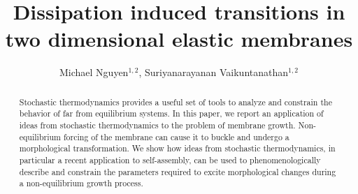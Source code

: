 \documentclass[amsmath,preprintnumbers,10pt,nofootinbib,prl,twocolumn]{revtex4-1}
\begin{document}
\title{Dissipation induced transitions in two dimensional elastic membranes}
\author{Michael Nguyen$^{1,2}$, Suriyanarayanan Vaikuntanathan$^{1,2}$} 
\begin{abstract}
Stochastic thermodynamics provides a useful set of tools to analyze and constrain the behavior of far from equilibrium systems. In this paper, we report an application of ideas from stochastic thermodynamics to the problem of membrane growth. Non-equilibrium forcing of the membrane can cause it to buckle and undergo a morphological transformation. We show how ideas from stochastic thermodynamics, in particular a recent application to self-assembly, can be used to phenomenologically describe and constrain the parameters required to excite morphological changes during a non-equilibrium growth process.

\end{abstract}
\maketitle 
\end{document}
